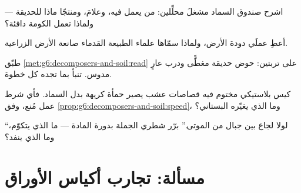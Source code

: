 \begin{exercise}[$\star\star$]\label{exo:g6:decomposers-and-soil:8}
اشرح صندوق السماد مشغلَ محلِّلين: من يعمل فيه، وعلامَ، ومنتجًا ماذا
للحديقة --- ولماذا تعمل الكومة دافئة؟
\end{exercise}

\begin{exercise}[$\star\star$]\label{exo:g6:decomposers-and-soil:9}
أعطِ عملَي دودة الأرض، ولماذا سمّاها علماء الطبيعة القدماء صانعة
الأرض الزراعية.
\end{exercise}

\begin{exercise}[$\star\star$]\label{exo:g6:decomposers-and-soil:10}
طبّق \cref{met:g6:decomposers-and-soil:read} على تربتين: حوض حديقة
مغطًّى ودرب عارٍ مدوس. تنبأ بما تجده كل خطوة.
\end{exercise}

\begin{exercise}[$\star\star$]\label{exo:g6:decomposers-and-soil:11}
كيس بلاستيكي مختوم فيه قصاصات عشب يصير حمأة كريهة بدل السماد. فأي
شرط عمل مُنع، وفق \cref{prop:g6:decomposers-and-soil:speed}، وما
الذي يغيّره البستاني؟
\end{exercise}

\begin{exercise}[$\star\star\star$]\label{exo:g6:decomposers-and-soil:12}
``لولا  لجاع  بين جبال من الموتى.'' برّر شطري
الجملة بدورة المادة --- ما الذي يتكوّم، وما الذي ينفد؟
\end{exercise}

\section{مسألة: تجارب أكياس الأوراق}

